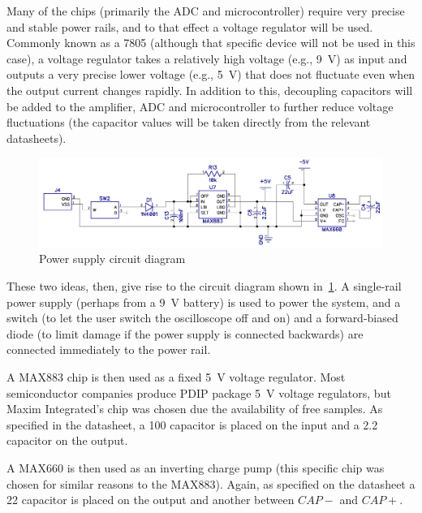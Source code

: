 Many of the chips (primarily the ADC and microcontroller) require very precise
and stable power rails, and to that effect a voltage regulator will be used.
Commonly known as a 7805 (although that specific device will not be used in this
case), a voltage regulator takes a relatively high voltage (e.g., \SI{9}{\V}) as
input and outputs a very precise lower voltage (e.g., \SI{5}{\V}) that does not
fluctuate even when the output current changes rapidly. In addition to this,
decoupling capacitors will be added to the amplifier, ADC and microcontroller to
further reduce voltage fluctuations (the capacitor values will be taken directly
from the relevant datasheets).

\begin{landscape}
  \begin{figure}[h]
    \includegraphics[width=\linewidth]{img/power_supply/circuit.png}
    \caption{Power supply circuit diagram}
    \label{fig:powerSupplyDiagram}
  \end{figure}
\end{landscape}

These two ideas, then, give rise to the circuit diagram shown
in~\cref{fig:powerSupplyDiagram}. A single-rail power supply (perhaps from a
\SI{9}{\V} battery) is used to power the system, and a switch (to let the user
switch the oscilloscope off and on) and a forward-biased diode (to limit damage
if the power supply is connected backwards) are connected immediately to the
power rail.

A MAX883 chip is then used as a fixed \SI{5}{\V} voltage regulator. Most
semiconductor companies produce PDIP package \SI{5}{\V} voltage regulators, but
Maxim Integrated's chip was chosen due the availability of free samples. As
specified in the datasheet, a \SI{100}{\nF} capacitor is placed on the input and
a \SI{2.2}{\uF} capacitor on the output.

A MAX660 is then used as an inverting charge pump (this specific chip was chosen
for similar reasons to the MAX883). Again, as specified on the datasheet a
\SI{22}{\uF} capacitor is placed on the output and another between $CAP-$ and
$CAP+$.

